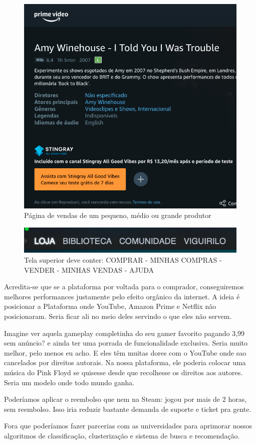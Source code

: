 \documentclass[a4paper,twoside]{article}
\begin{document}
\begin{figure}[H]
    \centering
    \includegraphics[scale=0.40,keepaspectratio=true]{images/06.png}
    \caption{Página de vendas de um pequeno, médio ou grande produtor}
\end{figure}

\begin{figure}[H]
    \centering
    \includegraphics[scale=0.50,keepaspectratio=true]{images/07.png}
    \caption{Tela superior deve conter: COMPRAR - MINHAS COMPRAS - VENDER - MINHAS VENDAS - AJUDA}
\end{figure}

Acredita-se que se a plataforma por voltada para o comprador, conseguiremos melhores performances justamente pelo efeito orgânico da internet. A ideia é posicionar a Plataforma onde YouTube, Amazon Prime e Netflix não posicionaram. Seria ficar ali no meio deles servindo o que eles não servem. 

Imagine ver aquela gameplay completinha do seu gamer favorito pagando 3,99 sem anúncio? e ainda ter uma porrada de funcionalidade exclusiva. Seria muito melhor, pelo menos eu acho. E eles têm muitas dores com o YouTube onde sao cancelados por direitos autorais. Na nossa plataforma, ele poderia colocar uma música do Pink Floyd se quisesse desde que recolhesse os direitos aos autores. Seria um modelo onde todo mundo ganha.

Poderíamos aplicar o reembolso que nem na Steam: jogou por mais de 2 horas, sem reembolso. Isso iria reduzir bastante demanda de suporte e ticket pra gente. 

Fora que poderíamos fazer parcerias com as universidades para aprimorar nossos algoritmos de classificação, clusterização e sistema de busca e recomendação. 
\end{document}
